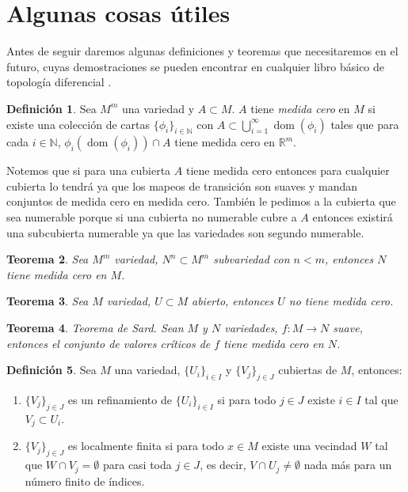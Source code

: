 \documentclass{report}
\newtheorem{theorem}{Teorema}[section]
\theoremstyle{definition}
\newtheorem{defi}[theorem]{Definici\'on}
\DeclareMathOperator{\dom}{dom}
\begin{document}
\section{Algunas cosas \'utiles}

Antes de seguir daremos algunas definiciones y teoremas que necesitaremos en el futuro, cuyas demostraciones se pueden encontrar en cualquier libro b\'asico de topolog\'ia diferencial \cite{Introduction to Differential Topology, Differential Topology}.

\begin{defi}
Sea $M^m$ una variedad y $A \subset M$. $A$ tiene \textit{medida cero} en $M$ si existe una colecci\'on de cartas $\{ \phi_i \}_{i \in \mathbb{N}}$ con $ A \subset \bigcup\limits_{i=1}^\infty \dom (\phi_i )$ tales que para cada $i \in \mathbb{N}$, $\phi_i (\dom (\phi_i)) \cap A$ tiene medida cero en $\mathbb{R}^m$.
\end{defi}

Notemos que si para una cubierta $A$ tiene medida cero entonces para cualquier cubierta lo tendr\'a ya que los mapeos de transici\'on son suaves y mandan conjuntos de medida cero en medida cero. Tambi\'en le pedimos a la cubierta que sea numerable porque si una cubierta no numerable cubre a $A$ entonces existir\'a una subcubierta numerable ya que las variedades son segundo numerable. 

\begin{theorem}
Sea $M^m$ variedad, $N^n \subset M^m$ subvariedad con $n < m$, entonces $N$ tiene medida cero en $M$.
\end{theorem}

\begin{theorem}
Sea $M$ variedad, $U \subset M$ abierto, entonces $U$ no tiene medida cero.
\end{theorem}

\begin{theorem}{Teorema de Sard.}
Sean $M$ y $N$ variedades, $f: M \to N$ suave, entonces el conjunto de valores cr\'iticos de $f$ tiene medida cero en $N$.
\end{theorem}

\begin{defi}
Sea $M$ una variedad, $\{ U_i \}_{i \in I}$ y $\{ V_j \}_{j \in J} $ cubiertas de $M$, entonces:
\begin{enumerate}
\item $\{ V_j \}_{j \in J} $ es un refinamiento de $\{ U_i \}_{i \in I}$ si para todo $j \in J$ existe $i \in I$ tal que $V_j \subset U_i$.
\item $\{ V_j \}_{j \in J}$ es localmente finita si para todo $x \in M$ existe una vecindad $W$ tal que $W \cap V_j = \emptyset$ para casi toda $j \in J$, es decir, $V \cap U_j \neq \emptyset$ nada m\'as para un n\'umero finito de \'indices.

\end{enumerate}
\end{defi}
\end{document}
